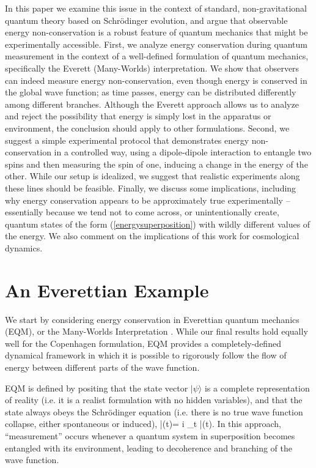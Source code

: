 \documentclass[12pt,aps,prd,onecolumn,nofootinbib,notitlepage]{revtex4-1}
\begin{document}
In this paper we examine this issue in the context of standard, non-gravitational quantum theory based on Schr\"odinger evolution, and argue that observable energy non-conservation is a robust feature of quantum mechanics that might be experimentally accessible.
First, we analyze energy conservation during quantum measurement in the context of a well-defined formulation of quantum mechanics, specifically the Everett (Many-Worlds) interpretation.
We show that observers can indeed measure energy non-conservation, even though energy is conserved in the global wave function; as time passes, energy can be distributed differently among different branches.
Although the Everett approach allows us to analyze and reject the possibility that energy is simply lost in the apparatus or environment, the conclusion should apply to other formulations.
Second, we suggest a simple experimental protocol that demonstrates energy non-conservation in a controlled way, using a dipole-dipole interaction to entangle two spins and then measuring the spin of one, inducing a change in the energy of the other.
While our setup is idealized, we suggest that realistic experiments along these lines should be feasible.
Finally, we discuss some implications, including why energy conservation appears to be approximately true experimentally -- essentially because we tend not to come across, or unintentionally create, quantum states of the form (\ref{energysuperposition}) with wildly different values of the energy.
We also comment on the implications of this work for cosmological dynamics.

\section{An Everettian Example}

We start by considering energy conservation in Everettian quantum mechanics (EQM), or the Many-Worlds Interpretation \cite{Everett:1957hd,Wallace:2012zla}.
While our final results hold equally well for the Copenhagen formulation, EQM provides a completely-defined dynamical framework in which it is possible to rigorously follow the flow of energy between different parts of the wave function.

EQM is defined by positing that the state vector $|\psi\rangle$ is a complete representation of reality (i.e. it is a realist formulation with no hidden variables), and that the state always obeys the Schr\"odinger equation (i.e. there is no true wave function collapse, either spontaneous or induced),
\be
  \ham |\psi(t)\rangle = i \partial_t |\psi(t)\rangle.
\ee
In this approach, ``measurement'' occurs whenever a quantum system in superposition becomes entangled with its environment, leading to decoherence and branching of the wave function.
\end{document}

